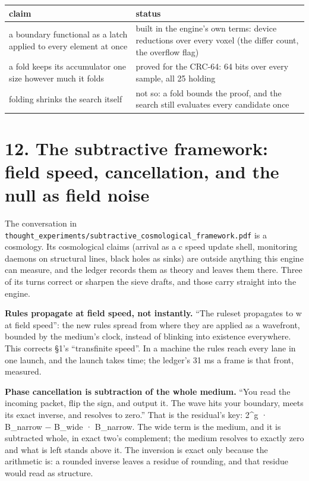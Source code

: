 {\small
\setlength{\tabcolsep}{6pt}
\begin{longtable}{>{\RaggedRight\arraybackslash}p{}>{\RaggedRight\arraybackslash}p{}}
\toprule
claim & status \\
\midrule
\endhead
a boundary functional as a latch applied to every element at once & built in the engine's own terms: device reductions over every voxel (the differ count, the overflow flag) \\
a fold keeps its accumulator one size however much it folds & proved for the CRC-64: 64 bits over every sample, all 25 holding \\
folding shrinks the search itself & not so: a fold bounds the proof, and the search still evaluates every candidate once \\
\bottomrule
\end{longtable}
}

\section{\texorpdfstring{12. The subtractive framework: field speed, cancellation, and the null as field noise}{12. The subtractive framework: field speed, cancellation, and the null as field noise}}

The conversation in \texttt{thought\_\allowbreak{}experiments/\allowbreak{}subtractive\_\allowbreak{}cosmological\_\allowbreak{}framework.\allowbreak{}pdf} is a cosmology. Its cosmological claims (arrival as a c speed update shell, monitoring daemons on structural lines, black holes as sinks) are outside anything this engine can measure, and the ledger records them as theory and leaves them there. Three of its turns correct or sharpen the sieve drafts, and those carry straight into the engine.

\textbf{Rules propagate at field speed, not instantly.} “The ruleset propagates to w at field speed”: the new rules spread from where they are applied as a wavefront, bounded by the medium's clock, instead of blinking into existence everywhere. This corrects §1's “transfinite speed”. In a machine the rules reach every lane in one launch, and the launch takes time; the ledger's 31 ms a frame is that front, measured.

\textbf{Phase cancellation is subtraction of the whole medium.} “You read the incoming packet, flip the sign, and output it. The wave hits your boundary, meets its exact inverse, and resolves to zero.” That is the residual's key: 2\textasciicircum{}g · B\_\allowbreak{}narrow − B\_\allowbreak{}wide · B\_\allowbreak{}narrow. The wide term is the medium, and it is subtracted whole, in exact two's complement; the medium resolves to exactly zero and what is left stands above it. The inversion is exact only because the arithmetic is: a rounded inverse leaves a residue of rounding, and that residue would read as structure.

